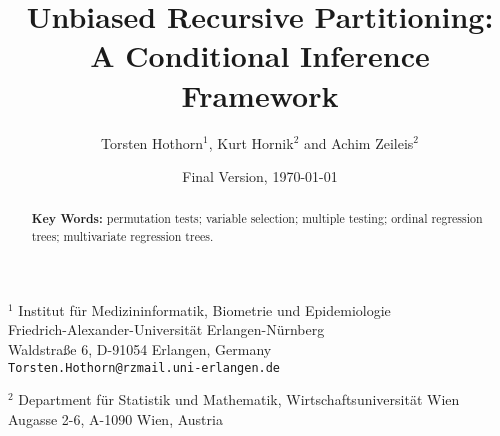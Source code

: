 \documentclass[letter]{article}
\begin{document}
\title{Unbiased Recursive Partitioning: \\ A Conditional Inference Framework}

\author{Torsten Hothorn$^1$, Kurt Hornik$^2$ and Achim Zeileis$^2$}

\date{Final Version, \today}

\maketitle

\noindent
$^1$ Institut f\"ur Medizininformatik, Biometrie und Epidemiologie\\
     Friedrich-Alexander-Universit\"at Erlangen-N\"urnberg\\
     Waldstra{\ss}e 6, D-91054 Erlangen, Germany \\
     \texttt{Torsten.Hothorn@rzmail.uni-erlangen.de}

\noindent
$^2$ Department f\"ur Statistik und Mathematik, Wirtschaftsuniversit\"at Wien \\
     Augasse 2-6, A-1090 Wien, Austria


\begin{abstract}


{\bf Key Words:} permutation tests; variable selection; multiple testing; 
                 ordinal regression trees; multivariate regression trees.
\end{abstract}

















\end{document}
